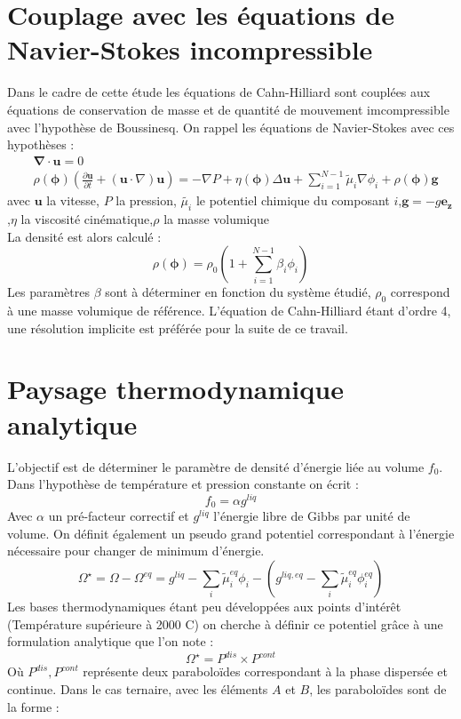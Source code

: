 \documentclass[a4paper,11pt]{report}    %
\begin{document}
\section{Couplage avec les équations de Navier-Stokes incompressible}
Dans le cadre de cette étude les équations de Cahn-Hilliard sont couplées aux équations de conservation de masse et de quantité de mouvement imcompressible avec l'hypothèse de Boussinesq. On rappel les équations de Navier-Stokes avec ces hypothèses :
\begin{align}
&\bm{\nabla} \cdot \mathbf{u} = 0\\
&\rho(\bm{\phi}) \left (\frac{\partial \mathbf{u}}{\partial t} + (\mathbf{u} \cdot {\nabla})\mathbf{u}\right) = -{\nabla} P +\eta(\bm{\phi}){\Delta} \mathbf{u}+\sum_{i=1}^{N-1} \tilde\mu_i{\nabla} \phi_i + \rho(\bm{\phi}) \mathbf{g}
\end{align}
avec $\mathbf{u}$ la vitesse, $P$ la pression, $\tilde{\mu_i}$ le potentiel chimique du composant $i$,$\mathbf{g} = -g \mathbf{e_z}$,$\eta$ la viscosité cinématique,$\rho$ la masse volumique\\
La densité est alors calculé : 
\begin{equation}
	\rho(\bm{\phi}) = \rho_0\left(1+\sum_{i=1}^{N-1}\beta_i \phi_i\right)
\end{equation}
Les paramètres $\beta$ sont à déterminer en fonction du système étudié, $\rho_0$ correspond à une masse volumique de référence. L'équation de Cahn-Hilliard étant d'ordre 4, une résolution implicite est préférée pour la suite de ce travail.
\section{Paysage thermodynamique analytique}
L'objectif est de déterminer le paramètre de densité d'énergie liée au volume $f_0$. Dans l'hypothèse de température et pression constante on écrit : 
\begin{equation}
	f_0 = \alpha g^{liq}
\end{equation}
Avec $\alpha$ un pré-facteur correctif et $g^{liq}$ l'énergie libre de Gibbs par unité de volume. On définit également un pseudo grand potentiel correspondant à l'énergie nécessaire pour changer de minimum d'énergie.
\begin{equation}
\Omega^{\star} =\Omega - \Omega^{eq} =  {g}^{liq} - \sum_i \tilde{\mu}_i^{eq}\phi_i - \left( {g}^{liq,eq} -  \sum_i \tilde{\mu}_i^{eq}\phi_i^{eq} \right) 
\end{equation}
Les bases thermodynamiques étant peu développées aux points d'intérêt (Température supérieure à 2000 \textdegree C) on cherche à définir ce potentiel grâce à une formulation analytique que l'on note :
\begin{equation}
	\Omega^{\star}  = P^{dis} \times P^{cont}
\end{equation}
Où $P^{dis}, P^{cont}$ représente deux paraboloïdes correspondant à la phase dispersée et continue. Dans le cas ternaire, avec les éléments $A$ et $B$, les paraboloïdes sont de la forme : 
\end{document}
